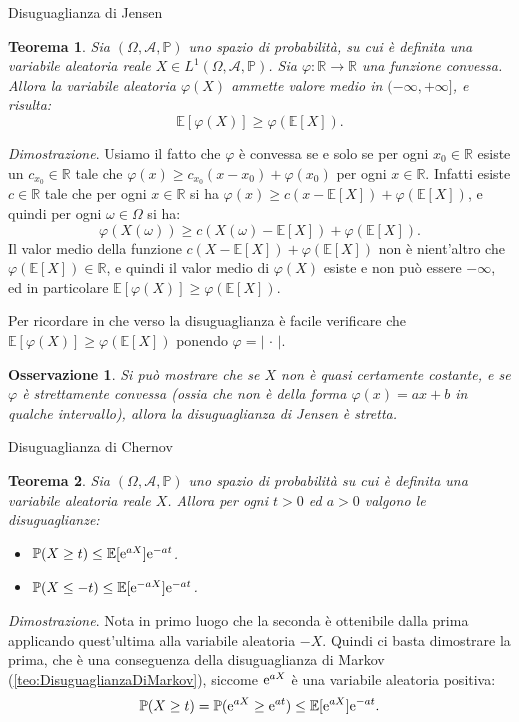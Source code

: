 \documentclass[11pt]{book}
\makeatletter
\theoremstyle{Definizione}
\theoremstyle{TeoremaProposizioneLemmaCorollario}
\newtheorem{myteo}{Teorema}[section]
\theoremstyle{OsservazioneNota}
\newtheorem{myobs}{Osservazione}[section]
\renewenvironment{proof}[1][\proofname]{\par
  \normalfont \topsep6\p@\@plus6\p@\relax
  \trivlist
  \item[\hskip\labelsep
        \itshape
    #1\@addpunct{.}]\ignorespaces
}{%
  \endtrivlist\@endpefalse
}
\newcommand{\R}{\mathbb{R}}
\renewcommand{\P}{\mathbb{P}}
\newcommand{\e}{\textup{e}}
\newcommand{\E}{\mathbb{E}}
\renewenvironment{proof}{\textsl{Dimostrazione}.}{}
\makeatother
\begin{document}
\begin{boxteo}{Disuguaglianza di Jensen}
\begin{myteo}\label{teo:DisuguaglianzaDiJensen}
Sia $(\Omega,\mathcal{A},\P)$ uno spazio di probabilità, su cui è definita una variabile aleatoria reale $X\in L^1(\Omega,\mathcal{A},\P)$. Sia $\varphi:\R \longrightarrow \R$ una funzione convessa. Allora la variabile aleatoria $\varphi(X)$ ammette valore medio in $(-\infty,+\infty]$, e risulta:
$$
\E[\varphi(X)] \geq \varphi(\E[X]).
$$
\end{myteo}
\tcblower
\begin{proof}
Usiamo il fatto che $\varphi$ è convessa se e solo se per ogni $x_0\in \R$ esiste un $c_{x_0}\in \R$ tale che $\varphi(x) \geq c_{x_0}(x-x_0)+\varphi(x_0)$ per ogni $x\in \R$. Infatti esiste $c\in \R$ tale che per ogni $x\in \R$ si ha $\varphi(x) \geq c(x-\E[X])+\varphi(\E[X])$, e quindi per ogni $\omega\in \Omega$ si ha:
$$
\varphi(X(\omega)) \geq c(X(\omega)-\E[X])+\varphi(\E[X]).
$$
Il valor medio della funzione $c(X-\E[X])+\varphi(\E[X])$ non è nient'altro che $\varphi(\E[X])\in \R$, e quindi il valor medio di $\varphi(X)$ esiste e non può essere $-\infty$, ed in particolare $\E[\varphi(X)] \geq \varphi(\E[X])$.
\end{proof}
\end{boxteo}
\noindent
Per ricordare in che verso la disuguaglianza è facile verificare che $\E[\varphi(X)] \geq \varphi(\E[X])$ ponendo $\varphi = |\,\cdot\,|$.
\begin{myobs}
Si può mostrare che se $X$ non è quasi certamente costante, e se $\varphi$ è strettamente convessa (ossia che non è della forma $\varphi(x) = ax+b$ in qualche intervallo), allora la disuguaglianza di Jensen è stretta.
\end{myobs}
\begin{boxteo}{Disuguaglianza di Chernov}
\begin{myteo}\label{teo:DisuguaglianzaDiChernov}
Sia $(\Omega,\mathcal{A},\P)$ uno spazio di probabilità su cui è definita una variabile aleatoria reale $X$. Allora per ogni $t > 0$ ed $a > 0$ valgono le disuguaglianze:
\begin{itemize}
\item $\P(X \geq t) \leq \E[\e^{aX}] \e^{-at}$.
\item $\P(X \leq -t) \leq \E[\e^{-aX}]\e^{-at}$.
\end{itemize}
\end{myteo}
\tcblower
\begin{proof}
Nota in primo luogo che la seconda è ottenibile dalla prima applicando quest'ultima alla variabile aleatoria $-X$. Quindi ci basta dimostrare la prima, che è una conseguenza della disuguaglianza di Markov (\ref{teo:DisuguaglianzaDiMarkov}), siccome $\e^{aX}$ è una variabile aleatoria positiva:
$$
\P(X \geq t) = \P( \e^{aX} \geq \e^{at}) \leq \E[\e^{aX}] \e^{-at}.
$$
\end{proof}
\end{boxteo}
\end{document}
